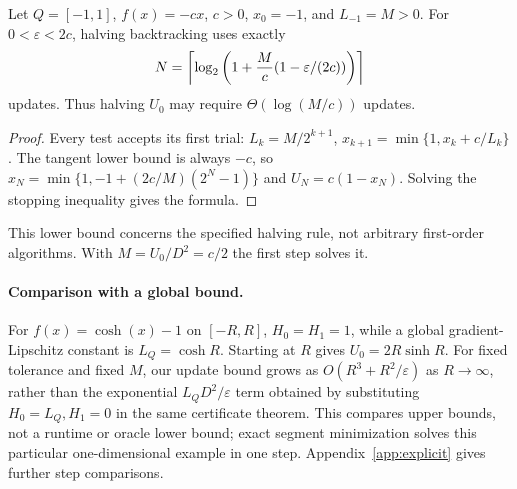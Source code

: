 \begin{proposition}
\label{prop:init}
Let $Q=[-1,1]$, $f(x)=-cx$, $c>0$, $x_0=-1$, and $L_{-1}=M>0$.
For $0<\varepsilon<2c$, halving backtracking uses exactly
\[
 N=\left\lceil\log_2\left(1+\frac Mc(1-\varepsilon/(2c))\right)\right\rceil
\]
updates. Thus halving $U_0$ may require $\Theta(\log(M/c))$ updates.
\end{proposition}
\begin{proof}
Every test accepts its first trial: $L_k=M/2^{k+1}$,
$x_{k+1}=\min\{1,x_k+c/L_k\}$. The tangent lower bound is always
$-c$, so $x_N=\min\{1,-1+(2c/M)(2^N-1)\}$ and $U_N=c(1-x_N)$.
Solving the stopping inequality gives the formula.
\end{proof}
This lower bound concerns the specified halving rule, not arbitrary
first-order algorithms. With $M=U_0/D^2=c/2$ the first step solves it.

\paragraph{Comparison with a global bound.}
For $f(x)=\cosh(x)-1$ on $[-R,R]$, $H_0=H_1=1$, while a global
gradient-Lipschitz constant is $L_Q=\cosh R$. Starting at $R$ gives
$U_0=2R\sinh R$. For fixed tolerance and fixed $M$, our update bound
grows as $O(R^3+R^2/\varepsilon)$ as $R\to\infty$, rather than the
exponential $L_QD^2/\varepsilon$ term obtained by substituting
$H_0=L_Q,H_1=0$ in the same certificate theorem.
This compares upper bounds, not a runtime or oracle lower bound;
exact segment minimization solves this particular one-dimensional example
in one step. Appendix~\ref{app:explicit} gives further step comparisons.

